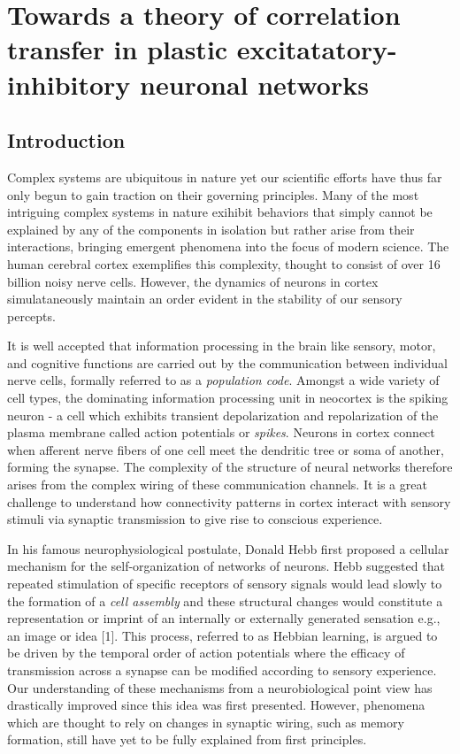 \documentclass{ucetd}
\begin{document}
\mainmatter

\chapter{Towards a theory of correlation transfer in plastic excitatatory-inhibitory neuronal networks}

\section{Introduction}

Complex systems are ubiquitous in nature yet our scientific efforts have thus far only begun to gain traction on their governing principles. Many of the most intriguing complex systems in nature exihibit behaviors that simply cannot be explained by any of the components in isolation but rather arise from their interactions, bringing emergent phenomena into the focus of modern science. The human cerebral cortex exemplifies this complexity, thought to consist of over 16 billion noisy nerve cells. However, the dynamics of neurons in cortex simulataneously maintain an order evident in the stability of our sensory percepts.

It is well accepted that information processing in the brain like sensory, motor, and cognitive functions are carried out by the communication between individual nerve cells, formally referred to as a \emph{population code}. Amongst a wide variety of cell types, the dominating information processing unit in neocortex is the spiking neuron - a  cell which exhibits transient depolarization and repolarization of the plasma membrane called action potentials or \emph{spikes}.  Neurons in cortex connect when afferent nerve fibers of one cell meet the dendritic tree or soma of another, forming the synapse. The complexity of the structure of neural networks therefore arises from the complex wiring of these communication channels. It is a great challenge to understand how connectivity patterns in cortex interact with sensory stimuli via synaptic transmission to give rise to conscious experience. 

In his famous neurophysiological postulate, Donald Hebb first proposed a cellular mechanism for the self-organization of networks of neurons. Hebb suggested that repeated stimulation of specific receptors of sensory signals would lead slowly to the formation of a \emph{cell assembly} and these structural changes would constitute a representation or imprint of an internally or externally generated sensation e.g., an image or idea [1]. This process, referred to as Hebbian learning, is argued to be driven by the temporal order of action potentials where the efficacy of transmission across a synapse can be modified according to sensory experience. Our understanding of these mechanisms from a neurobiological point view has drastically improved since this idea was first presented. However, phenomena which are thought to rely on changes in synaptic wiring, such as memory formation, still have yet to be fully explained from first principles.
\end{document}
